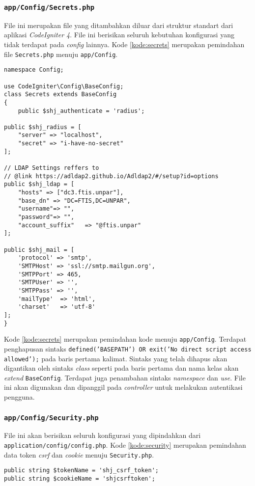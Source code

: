\subsubsection{\texttt{app/Config/Secrets.php}}
File ini merupakan file yang ditambahkan diluar dari struktur standart dari aplikasi \textit{CodeIgniter 4}. File ini berisikan seluruh kebutuhan konfigurasi yang tidak terdapat pada \textit{config} lainnya. Kode \ref{kode:secrets} merupakan pemindahan file \texttt{Secrets.php} menuju \texttt{app/Config}.
\begin{lstlisting}[caption=Penambahan file \textit{secrets}, label=kode:secrets]
namespace Config;

use CodeIgniter\Config\BaseConfig;
class Secrets extends BaseConfig
{ 
	public $shj_authenticate = 'radius';

public $shj_radius = [
    "server" => "localhost",
    "secret" => "i-have-no-secret"
];

// LDAP Settings reffers to
// @link https://adldap2.github.io/Adldap2/#/setup?id=options
public $shj_ldap = [
    "hosts" => ["dc3.ftis.unpar"],
    "base_dn" => "DC=FTIS,DC=UNPAR",
    "username"=> "",
    "password"=> "",
    "account_suffix"   => "@ftis.unpar"
];

public $shj_mail = [
    'protocol' => 'smtp',
    'SMTPHost' => 'ssl://smtp.mailgun.org',
    'SMTPPort' => 465,
    'SMTPUser' => '',
    'SMTPPass' => '',
    'mailType'  => 'html',
    'charset'   => 'utf-8'
];
}
\end{lstlisting}

Kode \ref{kode:secrets} merupakan pemindahan kode menuju \texttt{app/Config}. Terdapat penghapusan sintaks \texttt{defined('BASEPATH') OR exit('No direct script access allowed');} pada baris pertama kalimat. Sintaks yang telah dihapus akan digantikan oleh sintaks \textit{class} seperti pada baris pertama dan nama kelas akan \textit{extend} \texttt{BaseConfig}. Terdapat juga penambahan sintaks \textit{namespace} dan \textit{use}. File ini akan digunakan dan dipanggil pada \textit{controller} untuk melakukan autentikasi pengguna.

\subsubsection{\texttt{app/Config/Security.php}}
File ini akan berisikan seluruh konfigurasi yang dipindahkan dari \texttt{application/config/config.php}. Kode \ref{kode:security} merupakan pemindahan data token \textit{csrf} dan \textit{cookie} menuju \texttt{Security.php}.
\begin{lstlisting}[caption=Pemindahan file \textit{config} menuju \textit{Security}, label=kode:security]
public string $tokenName = 'shj_csrf_token';
public string $cookieName = 'shjcsrftoken';
\end{lstlisting}


